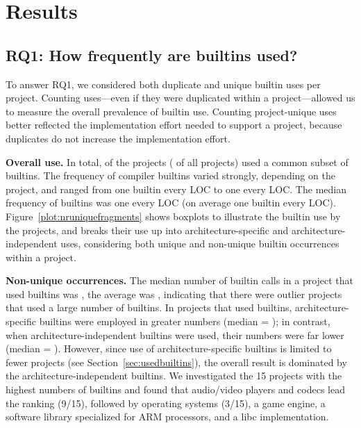\documentclass[sigconf,screen]{acmart}
\renewcommand{\paragraph}[1]{\textbf{#1}}
\begin{document}
\section{Results}

\subsection{RQ1: How frequently are builtins used?}
\label{sec:frequency}

To answer RQ1, we considered both duplicate and unique builtin uses per project.
Counting uses---even if they were duplicated within a project---allowed us to measure the overall prevalence of builtin use.
Counting project-unique uses better reflected the implementation effort needed to support a project, because duplicates do not increase the implementation effort.

\paragraph{Overall use.}
In total, \nrProjectsWithBuiltins{} of the projects (\percentageProjectsWithBuiltins{} of all projects) used a common subset of \nrUsedBuiltins{} builtins.
The frequency of compiler builtins varied strongly, depending on the project, and ranged from one builtin every \minBuiltinEveryXLOC{} LOC to one every \maxBuiltinEveryXLOC{} LOC.
The median frequency of builtins was one every \medianBuiltinEveryXLOC{} LOC (on average one builtin every \avgBuiltinEveryXLOC{} LOC).
Figure~\ref{plot:nruniquefragments} shows boxplots to illustrate the builtin use by the projects, and breaks their use up into architecture-specific and architecture-independent uses, considering both unique and non-unique builtin occurrences within a project.

\paragraph{Non-unique occurrences.}
The median number of builtin calls in a project that used builtins was \medianNrBuiltinsPerProject{}, the average was \avgNrBuiltinsPerProject{}, indicating that there were outlier projects that used a large number of builtins.
In projects that used builtins, architecture-specific builtins were employed in greater numbers (median = \medianNrMachineSpecificBuiltinsPerProject{}); in contrast, when architecture-independent builtins were used, their numbers were far lower (median = \medianNrMachineIndependentBuiltinsPerProject{}).
However, since use of architecture-specific builtins is limited to fewer projects (see Section~\ref{sec:usedbuiltins}), the overall result is dominated by the ar\-chi\-tec\-ture-independent builtins.
We investigated the 15 projects with the highest numbers of builtins and found that audio/video players and codecs lead the ranking (9/15), followed by operating systems (3/15), a game engine, a software library specialized for ARM processors, and a libc implementation.
\end{document}
